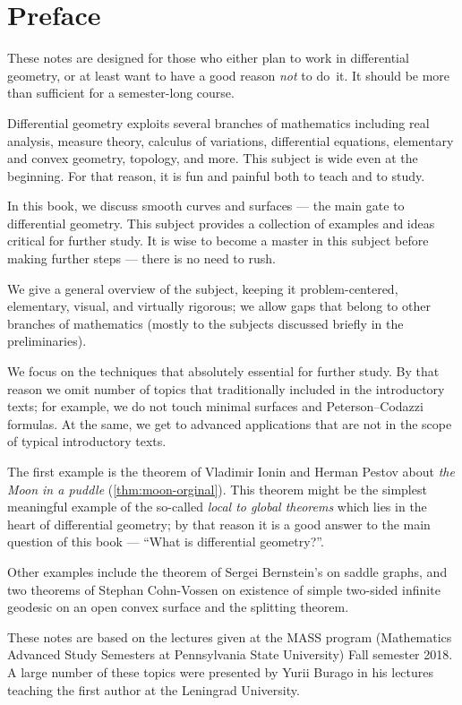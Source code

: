 
\chapter*{Preface}

These notes are designed for those who either plan to work in differential geometry,
or at least want to have a good reason \emph{not} to do~it.
It should be more than sufficient for a semester-long course. 

Differential geometry exploits several branches of mathematics including 
real analysis, 
measure theory,
calculus of variations,
differential equations,
elementary and convex geometry,
topology, and more.
This subject is wide even at the beginning. 
For that reason, it is fun and painful both to teach and to study.

In this book, we discuss smooth curves and surfaces --- the main gate to differential geometry.
This subject provides a collection of examples and ideas critical for further study.
It is wise to become a master in this subject before making further steps --- there is no need to rush.

We give a general overview of the subject, keeping it
problem-centered,
elementary, 
visual, 
and virtually rigorous; we allow gaps that belong to other branches of mathematics (mostly to the subjects discussed briefly in the preliminaries).

We focus on the techniques that absolutely essential for further study.
By that reason we omit number of topics that traditionally included in the introductory texts;
for example, we do not touch %
minimal surfaces and Peterson--Codazzi formulas.
At the same, we get to advanced applications
 that are not in the scope of typical introductory texts.
 
The first example is the theorem of Vladimir Ionin and Herman Pestov about \emph{the Moon in a puddle} (\ref{thm:moon-orginal}).
This theorem might be the simplest meaningful example of the so-called {}\emph{local to global theorems} which lies in the heart of differential geometry;
by that reason it is a good answer to the main question of this book --- ``What is differential geometry?''.

Other examples include the theorem of Sergei Bernstein's on saddle graphs, and two theorems of Stephan Cohn-Vossen on existence of simple two-sided infinite geodesic on an open convex surface and the splitting theorem.

These notes are based on the lectures given at the MASS program (Mathematics Advanced Study Semesters at Pennsylvania State University) Fall semester 2018.
A large number of these topics were presented by Yurii Burago in his lectures teaching the first author at the Leningrad University.

